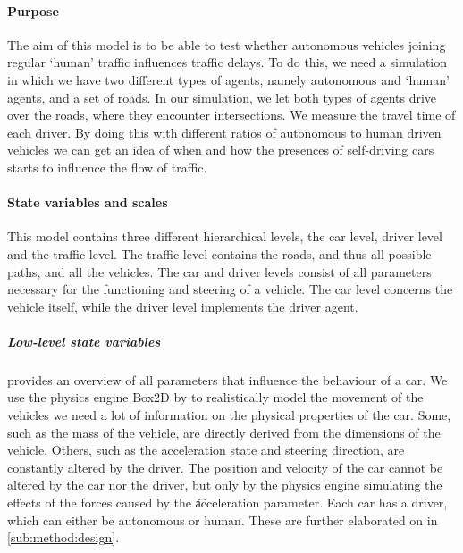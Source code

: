 \paragraph{Purpose}
\label{par:method:model:overview:purpose}
The aim of this model is to be able to test whether autonomous vehicles joining regular `human' traffic influences traffic delays. To do this, we need a simulation in which we have two different types of agents, namely autonomous and `human' agents, and a set of roads. In our simulation, we let both types of agents drive over the roads, where they encounter intersections. We  measure the travel time of each driver. By doing this with different ratios of autonomous to human driven vehicles we can get an idea of when and how the presences of self-driving cars starts to influence the flow of traffic.

\paragraph{State variables and scales}
\label{par:method:model:overview:state}
This model contains three different hierarchical levels, the car level, driver level and the traffic level. The traffic level contains the roads, and thus all possible paths, and all the vehicles. The car and driver levels consist of all parameters necessary for the functioning and steering of a vehicle. The car level concerns the vehicle itself, while the driver level implements the driver agent.

\subparagraph{Low-level state variables}
 provides an overview of all parameters that influence the behaviour of a car. 
We use the physics engine Box2D by \textcite{catto2011box2d} to realistically model the movement of the vehicles we need a lot of information on the physical properties of the car. Some, such as the mass of the vehicle, are directly derived from the dimensions of the vehicle. Others, such as the acceleration state and steering direction, are constantly altered by the driver. The position and velocity of the car cannot be altered by the car nor the driver, but only by the physics engine simulating the effects of the forces caused by the \t{acceleration} parameter.
Each car has a driver, which can either be autonomous or human. These are further elaborated on in \cref{sub:method:design}.

